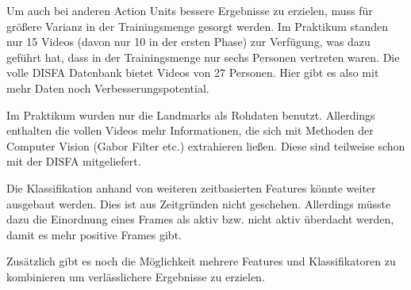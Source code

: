 Um auch bei anderen Action Units bessere Ergebnisse zu erzielen, muss für
größere Varianz in der Trainingsmenge gesorgt werden. Im Praktikum standen nur
15 Videos (davon nur 10 in der ersten Phase) zur Verfügung, was dazu geführt
hat, dass in der Trainingsmenge nur sechs Personen vertreten waren. Die volle
DISFA Datenbank bietet Videos von 27 Personen. Hier gibt es also mit mehr Daten
noch Verbesserungspotential.

Im Praktikum wurden nur die Landmarks als Rohdaten benutzt. Allerdings enthalten
die vollen Videos mehr Informationen, die sich mit Methoden der Computer Vision
(Gabor Filter etc.) extrahieren ließen. Diese sind teilweise schon mit der DISFA mitgeliefert.

Die Klassifikation anhand von weiteren zeitbasierten Features könnte weiter ausgebaut
werden. Dies ist aus Zeitgründen nicht geschehen. Allerdings müsste dazu die
Einordnung eines Frames als aktiv bzw. nicht aktiv überdacht werden, damit es
mehr positive Frames gibt.

Zusätzlich gibt es noch die Möglichkeit mehrere Features und Klassifikatoren zu kombinieren um verlässlichere Ergebnisse zu erzielen.

